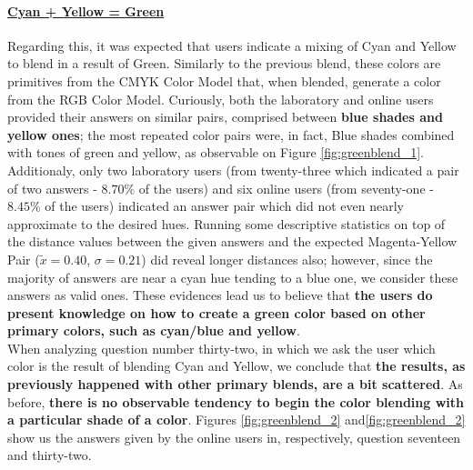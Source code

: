 \paragraph{\ul{Cyan + Yellow = Green}}
%
Regarding this, it was expected that users indicate a mixing of Cyan and Yellow to blend in a result of Green. Similarly to the previous blend, these colors are primitives from the CMYK Color Model that, when blended,
generate a color from the RGB Color Model. Curiously, both the laboratory and online users provided their answers on similar pairs, comprised between \textbf{blue shades and yellow ones}; the most repeated
color pairs were, in fact, Blue shades combined with tones of green and yellow, as observable on Figure \ref{fig:greenblend_1}. \\
%
Additionaly, only two laboratory users (from twenty-three which indicated a pair of two answers - $8.70\%$ of the users) and six online users (from seventy-one - $8.45\%$ of the users) indicated an answer pair which did not even
nearly approximate to the desired hues. Running some descriptive statistics on top of the distance values between the given answers and the expected Magenta-Yellow Pair ($\tilde{x} = 0.40$, $\sigma = 0.21$) did reveal longer distances
also; however, since the majority of answers are near a cyan hue tending to a blue one, we consider these answers as valid ones. These evidences lead us to believe that \textbf{the users do present knowledge on how to create a green color
based on other primary colors, such as cyan/blue and yellow}. \\
%
When analyzing question number thirty-two, in which we ask the user which color is the result of blending Cyan and Yellow, we conclude that \textbf{the results, as previously happened with other primary blends, are a bit scattered}.
As before, \textbf{there is no observable tendency to begin the color blending with a particular shade of a color}. Figures \ref{fig:greenblend_2} and\ref{fig:greenblend_2} show us the answers given by the online users in, respectively,
question seventeen and thirty-two.
%
